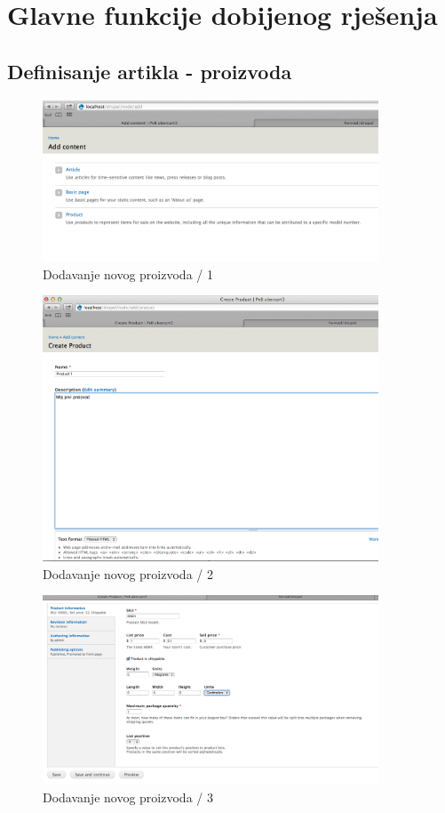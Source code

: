 \documentclass[times, utf8, seminar]{fit}
\begin{document}
{{\chapter{Glavne funkcije dobijenog rješenja}
\vspace*{-0.7cm}

\section{Definisanje artikla - proizvoda}

\begin{figure}[H]
\centering
\includegraphics[width=10cm]{img/drupal_add_content_1.png}
\caption{Dodavanje novog proizvoda / 1}
\end{figure}


\begin{figure}[H]
\centering
\includegraphics[width=10cm]{img/drupal_add_content_2.png}
\caption{Dodavanje novog proizvoda / 2}
\end{figure}

\begin{figure}[H]
\centering
\includegraphics[width=10cm]{img/drupal_add_content_3.png}
\caption{Dodavanje novog proizvoda / 3}
\end{figure}

}}
\end{document}
